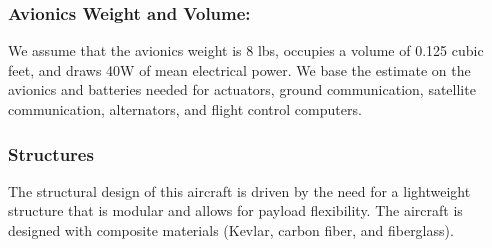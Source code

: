 \documentclass[journal]{aiaa-tc}%
\begin{document}
\subsubsection{Avionics Weight and Volume:} We assume that the avionics weight is 8 lbs, occupies a volume of 0.125 cubic feet, and draws 40W of mean electrical power. We base the estimate on the avionics and batteries needed for actuators, ground communication, satellite communication, alternators, and flight control computers.

\subsubsection{Structures} 

The structural design of this aircraft is driven by the need for a lightweight structure that is modular and allows for payload flexibility. The aircraft is designed with composite materials (Kevlar, carbon fiber, and fiberglass).
\end{document}
